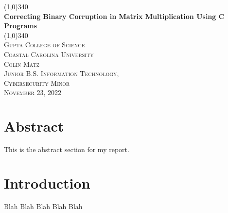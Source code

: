 \documentclass{article}
\begin{document}
    \begin{titlepage}
        \begin{center}
            \line(1,0){340} \\
            [5mm]
            \huge{\bfseries Correcting Binary Corruption in Matrix Multiplication Using C Programs} \\
            \line(1,0){340} \\
            [.25 in]
            \textsc{\LARGE Gupta College of Science} \\
            \textsc{\LARGE Coastal Carolina University} \\
            [.25 in]
            \textsc{\LARGE Colin Matz \\
            Junior B.S. Information Technology, \\ 
            Cybersecurity Minor \\
            November 23, 2022} \\
        \end{center}
    \end{titlepage}

    \section*{Abstract}\label{sec:abstract}
    This is the abstract section for my report.

    \newpage

    \listoffigures
    \newpage

    \listoftables
    \newpage

    \tableofcontents
    \thispagestyle{empty}

    \newpage
    \setcounter{page}{1}

    \section{Introduction}\label{sec:intro}
    Blah Blah Blah Blah Blah
\end{document}
